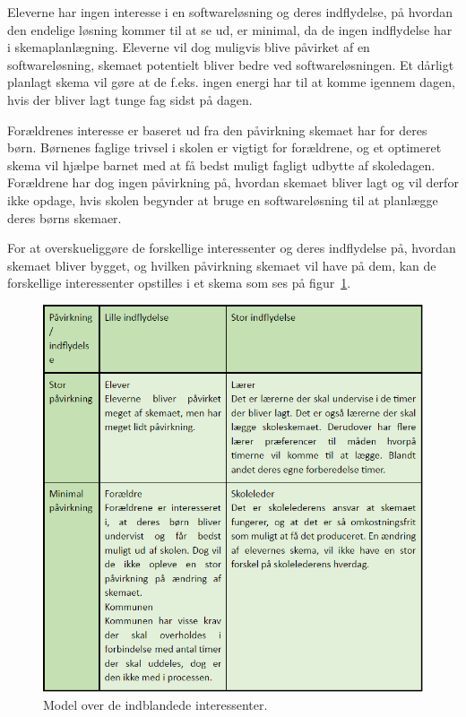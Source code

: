 Eleverne har ingen interesse i en softwareløsning og deres indflydelse, på hvordan den endelige løsning kommer til at se ud, er minimal, da de ingen indflydelse har i skemaplanlægning. Eleverne vil dog muligvis blive påvirket af en softwareløsning, skemaet potentielt bliver bedre ved softwareløsningen. Et dårligt planlagt skema vil gøre at de f.eks. ingen energi har til at komme igennem dagen, hvis der bliver lagt tunge fag sidst på dagen.


Forældrenes interesse er baseret ud fra den påvirkning skemaet har for deres børn. Børnenes faglige trivsel i skolen er vigtigt for forældrene, og et optimeret skema vil hjælpe barnet med at få bedst muligt fagligt udbytte af skoledagen. Forældrene har dog ingen påvirkning på, hvordan skemaet bliver lagt og vil derfor ikke opdage, hvis skolen begynder at bruge en softwareløsning til at planlægge deres børns skemaer.

For at overskueliggøre de forskellige interessenter og deres indflydelse på, hvordan skemaet bliver bygget, og hvilken påvirkning skemaet vil have på dem, kan de forskellige interessenter opstilles i et skema som ses på figur~\ref{fig:interessenter}.
\begin{figure}[!h]
  \centering
  \includegraphics[width=\textwidth]{partials/graphics/interessentanalyse.png}
  \caption{Model over de indblandede interessenter.}
  \label{fig:interessenter}
\end{figure}
